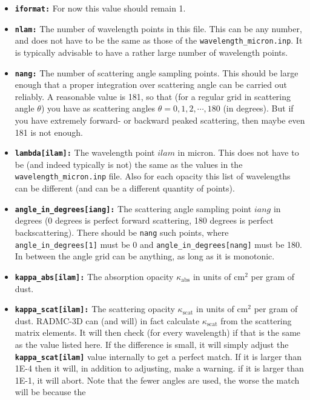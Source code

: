 \documentclass{report}
\begin{document}
\begin{itemize}
\item[] {\small\tt\bf iformat:} For now this value should remain 1.
\item[] {\small\tt\bf nlam:} The number of wavelength points in this file. This
  can be any number, and does not have to be the same as those of the
  {\small\tt wavelength\_micron.inp}. It is typically advisable to have a rather
  large number of wavelength points.
\item[] {\small\tt\bf nang:} The number of scattering angle sampling points.
  This should be large enough that a proper integration over scattering angle
  can be carried out reliably. A reasonable value is 181, so that (for
  a regular grid in scattering angle $\theta$) you have as scattering angles
  $\theta=0,1,2,\cdots,180$ (in degrees). But if you have extremely forward-
  or backward peaked scattering, then maybe even 181 is not enough. 
\item[] {\small\tt\bf lambda[ilam]:} The wavelength point $ilam$ in micron. This does
  not have to be (and indeed typically is not) the same as the values in the
  {\small\tt wavelength\_micron.inp} file. Also for each opacity this list of
  wavelengths can be different (and can be a different quantity of points).
\item[] {\small\tt\bf angle\_in\_degrees[iang]:} The scattering angle
  sampling point $iang$ in degrees (0 degrees is perfect forward scattering,
  180 degrees is perfect backscattering). There should be {\small\tt nang}
  such points, where {\small\tt angle\_in\_degrees[1]} must be 0 and
  {\small\tt angle\_in\_degrees[nang]} must be 180. In between the angle
  grid can be anything, as long as it is monotonic.
\item[] {\small\tt\bf kappa\_abs[ilam]:} The absorption opacity $\kappa_{\mathrm{abs}}$ in units of cm$^2$ per gram of dust.
\item[] {\small\tt\bf kappa\_scat[ilam]:} The scattering opacity
  $\kappa_{\mathrm{scat}}$ in units of cm$^2$ per gram of dust. RADMC-3D can
  (and will) in fact calculate $\kappa_{\mathrm{scat}}$ from the scattering
  matrix elements. It will then check (for every wavelength) if that is the
  same as the value listed here. If the difference is small, it will simply
  adjust the {\small\tt\bf kappa\_scat[ilam]} value internally to get a
  perfect match. If it is larger than 1E-4 then it will, in addition to
  adjusting, make a warning. if it is larger than 1E-1, it will abort. Note
  that the fewer angles are used, the worse the match will be because the

\end{itemize}
\end{document}
